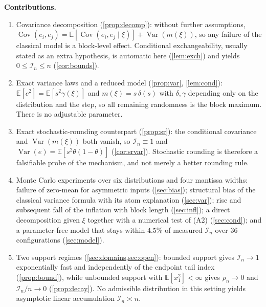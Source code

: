 \documentclass[twocolumn,review,hidelinks,oneeqnum,onetabnum,onefignum,onethmnum]{siamart251216}
\begin{document}
\medskip
\noindent\textbf{Contributions.}

\begin{enumerate}
\item Covariance decomposition (\cref{prop:decomp}): without further
assumptions,
$\operatorname{Cov}(e_i,e_j)=\mathbb{E}[\operatorname{Cov}(e_i,e_j\mid\xi)]
+\operatorname{Var}(m(\xi))$, so any failure of the classical model is a
block-level effect. Conditional exchangeability, usually stated as an extra
hypothesis, is automatic here (\cref{lem:exch}) and yields
$0\le\mathcal I_n\le n$ (\cref{cor:bounds}).

\item Exact variance laws and a reduced model
(\cref{prop:var}, \cref{lem:cond}): $\mathbb{E}[e^2]=\mathbb{E}[s^2\gamma(\xi)]$
and $m(\xi)=s\,\delta(s)$ with $\delta,\gamma$ depending only on the
distribution and the step, so all remaining randomness is the block maximum.
There is no adjustable parameter.

\item Exact stochastic-rounding counterpart (\cref{prop:sr}): the conditional
covariance and $\operatorname{Var}(m(\xi))$ both vanish, so
$\mathcal I_n\equiv1$ and $\operatorname{Var}(e)=\mathbb{E}[s^2\theta(1-\theta)]$
(\cref{cor:srvar}). Stochastic rounding is therefore a falsifiable probe of the
mechanism, and not merely a better rounding rule.

\item Monte Carlo experiments over six distributions and four mantissa widths:
failure of zero-mean for asymmetric inputs (\cref{sec:bias}); structural bias
of the classical variance formula with its atom explanation
(\cref{sec:var}); rise and subsequent fall of the inflation with block length
(\cref{sec:infl}); a direct decomposition given $\xi$ together with a numerical
test of (A2) (\cref{sec:cond}); and a parameter-free model that stays within
$4.5\%$ of measured $\mathcal I_n$ over $36$ configurations
(\cref{sec:model}).

\item Two support regimes (\cref{sec:domains,sec:open}): bounded support gives
$\mathcal I_n\to1$ exponentially fast and independently of the endpoint tail
index (\cref{prop:bound}), while unbounded support with
$\mathbb{E}[x_1^2]<\infty$ gives $\rho_n\to0$ and $\mathcal I_n/n\to0$
(\cref{prop:decay}). No admissible distribution in this setting yields
asymptotic linear accumulation $\mathcal I_n\asymp n$.
\end{enumerate}
\end{document}
